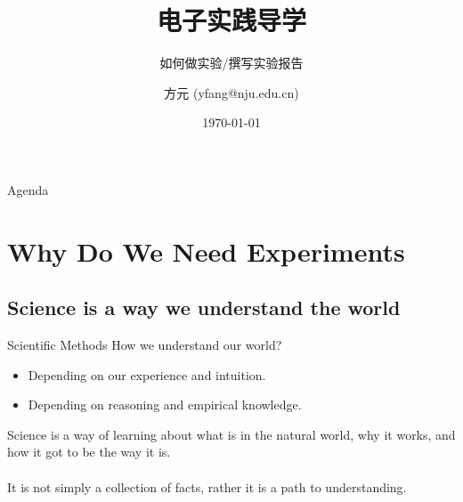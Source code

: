 \documentclass[14pt,t]{beamer}
\title[电子实践导学] %
{电子实践导学}
\subtitle{如何做实验/撰写实验报告}
\author[Fang Yuan (yfang@nju.edu.cn)]
{方元 (yfang@nju.edu.cn)}
\institute[南京大学电子学院] %
{南京大学电子学院}
\date[expcourse] %
{\today}
\begin{document}
\begin{frame}
  \titlepage
\end{frame}

\begin{frame}{Agenda}
  \tableofcontents
\end{frame}





\section{Why Do We Need Experiments}

\subsection{Science is a way we understand the world}

\begin{frame}{Scientific Methods}{}
    How we understand our world?
\begin{itemize}
    \item Depending on our experience and intuition.
    \item Depending on reasoning and empirical knowledge.
\end{itemize}

    Science is a way of learning about \alert{what} is in the natural world,
    \alert{why} it works, and \alert{how} it got to be the way it is.
    \ \\ \ \\

    It is not simply a collection of facts, rather it is a path to
    understanding. 

\end{frame}
\end{document}
